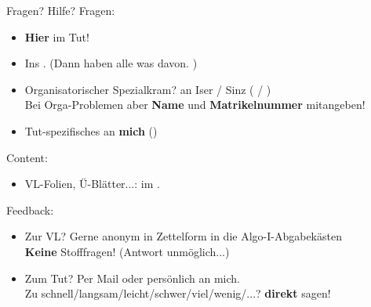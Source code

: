 \begin{frame}{Fragen? Hilfe?}
	Fragen:
	\begin{itemize}
		\item \textbf{Hier} im Tut!
		\item Ins \ILIAS. (Dann haben alle was davon. \smiley) \\
		\pause
		\item Organisatorischer Spezialkram? \impl an  Iser / Sinz  ( /  ) \\
		Bei Orga-Problemen aber \textbf{Name} und \textbf{Matrikelnummer}  mitangeben! \\
		\item Tut-spezifisches an \textbf{mich} (\mailto{\mymail})
	\end{itemize}
	\pause
	Content:
	\begin{itemize}
		\item VL-Folien, Ü-Blätter...: im \ILIAS.
	\end{itemize}
	\pause
	Feedback:
	\begin{itemize}
		\item Zur VL? \impl Gerne anonym in Zettelform in die Algo-I-Abgabekästen \\
		\textbf{Keine} Stofffragen! (Antwort unmöglich...)
		\item Zum Tut? \impl Per Mail oder persönlich an mich. \smiley \\
			Zu schnell/langsam/leicht/schwer/viel/wenig/...? \impl \textbf{direkt} sagen!
	\end{itemize}
\end{frame}


